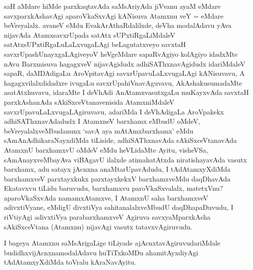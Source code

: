\begin{artha}
saH aMdare hiMde parxkaqtavAda saMsAriyAda jiVvanu ayaM eMdare savxparxkAshavAgi aparoVkaSxvAgi kANisuva Atamxnu veY = eMdare beVreyalalx. avaneV eMdu EvakArAthaRdalilxde, deVha modalAdavu yAva nijavAda AtamxsavxrUpada satAtx sUPxtiRgaLiMdaleV satAtxsUPxtiRgaLuLaLxvugaLAgi beLagutatxveyo savxtaH savxrUpashUnayxgaLAgiveyoV heVgeMdare sapaRvAgiyo kolAgiyo idadxMte nAvu Barxmisuva hagagxveV nijavAgidudx adhiSAThxnavAgidudx idariMdaleV sapaR, daMDAdigaLu AroVpitavAgi savxrUpavuLaLxvugaLAgi kANisuvavu, A hagagxvilalxdidadxre ivugaLu savxrUpahiVnavAguvavu, AkAshakusumadaMte asatAtxhuvavu, idaraMte I deVhAdi AnAtamxvasutxgaLu muKayxvAda savxtaH parxkAshanAda sAkiSxceVtanavenisida AtamxniMdaleV savxrUpavuLaLxvugaLAgiruvavu, adariMda I deVhAdigaLa AroVpakekx adhiSAThxnavAdadudx I AtamxneV barxhamx eMbudU oMdeV, beVreyalalxveMbudanunx `savA aya mAtAmxbarxhamx' eMdu sAmAnAdhikaraNayxdiMda tiLiside, adhiSAThxnavAda sAkiSxceVtanavAda AtamxnU barxhamxvU oMdeV eMdu heVLidaMte Ayitu, visheVSa, sAmAnayxveMbayAva viBAgavU ilalxde atimahatAtxda niratishayavAda vasutx barxhamx, adu satayx jAcnxna anaMtarUpavAdudu, I tAdAtamxyXdiMda barxhamxveV parxtayxkukx parxtayxkekxV barxhamxveMdu daqDhavAda Ekatavxvu tiLidu baruvudu, barxhamxvu paroVkaSxvalalx, matetxVnu?  aparoVkaSxvAda namamxAtamxve, I AtamxnU saha barxhamxveV adivxtiVyane, eMdigU divxtiVya sahitanalalxveMbudU daqDhapaDuvudu, I riVtiyAgi adivxtiVya parabarxhamxveV Agiruva savxyaMparxkAsha sAkiSxceVtana (Atamxnu) nijavAgi vasutx tatavxvAgiruvudu.
\end{artha}
\begin{artha}
I bageya Atamxnu saMsArigaLige tiLiyade ajAcnxtavAgiruvudariMdale budidhxvijAcnxnamodalAdavu huTiTxkoMDu ahamitAyxdiyAgi tAdAtamxyXdiMda toVralu kAraNavAyitu.
\end{artha}

